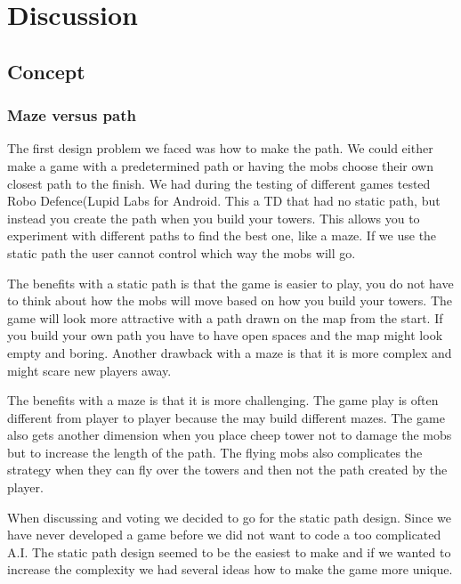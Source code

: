 \chapter{Discussion}
\section{Concept}
\subsection{Maze versus path}

The first design problem we faced was how to make the path. We could either make a game with a predetermined path or having the mobs choose their own closest path to the finish. We had during the testing of different games tested Robo Defence(Lupid Labs for Android. This a TD that had no static path, but instead you create the path when you build your towers. This allows you to experiment with different paths to find the best one, like a maze. If we use the static path the user cannot control which way the mobs will go.

The benefits with a static path is that the game is easier to play, you do not have to think about how the mobs will move based on how you build your towers. The game will look more attractive with a path drawn on the map from the start. If you build your own path you have to have open spaces and the map might look empty and boring. Another drawback with a maze is that it is more complex and might scare new players away.

The benefits with a maze is that it is more challenging. The game play is often different from player to player because the may build different mazes. The game also gets another dimension when you place cheep tower not to damage the mobs but to increase the length of the path. The flying mobs also complicates the strategy when they can fly over the towers and then not the path created by the player.

When discussing and voting we decided to go for the static path design. Since we have never developed a game before we did not want to code a too complicated A.I. The static path design seemed to be the easiest to make and if we wanted to increase the complexity we had several ideas how to make the game more unique.
